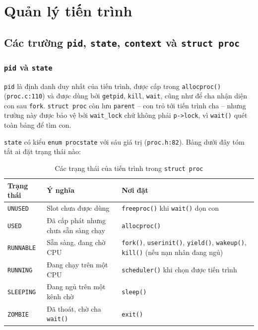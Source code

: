 \chapter{Quản lý tiến trình}

\newpage

\section{Các trường \texttt{pid}, \texttt{state}, \texttt{context} và \texttt{struct proc}}

\subsection{\texttt{pid} và \texttt{state}}

\texttt{pid} là định danh duy nhất của tiến trình, được cấp trong \texttt{allocproc()} (\texttt{proc.c:110}) và được dùng bởi \texttt{getpid}, \texttt{kill}, \texttt{wait}, cũng như để cha nhận diện con sau \texttt{fork}. \texttt{struct proc} còn lưu \texttt{parent} – con trỏ tới tiến trình cha – nhưng trường này được bảo vệ bởi \texttt{wait\_lock} chứ không phải \texttt{p->lock}, vì \texttt{wait()} quét toàn bảng để tìm con.

\texttt{state} có kiểu \texttt{enum procstate} với sáu giá trị (\texttt{proc.h:82}). Bảng dưới đây tóm tắt ai đặt trạng thái nào:

\begin{table}[H]
    \centering
    \renewcommand{\arraystretch}{1.3}
    \setlength{\tabcolsep}{8pt}
    \begin{tabular}{|l|p{4.5cm}|p{7.5cm}|}
        \hline
        \rowcolor[rgb]{0.8, 0.9, 1.0}
        \textbf{Trạng thái} & \textbf{Ý nghĩa} & \textbf{Nơi đặt} \\ \hline
        \texttt{UNUSED} & Slot chưa được dùng & \texttt{freeproc()} khi \texttt{wait()} dọn con \\ \hline
        \texttt{USED} & Đã cấp phát nhưng chưa sẵn sàng chạy & \texttt{allocproc()} \\ \hline
        \texttt{RUNNABLE} & Sẵn sàng, đang chờ CPU & \texttt{fork()}, \texttt{userinit()}, \texttt{yield()}, \texttt{wakeup()}, \texttt{kill()} (nếu nạn nhân đang ngủ) \\ \hline
        \texttt{RUNNING} & Đang chạy trên một CPU & \texttt{scheduler()} khi chọn được tiến trình \\ \hline
        \texttt{SLEEPING} & Đang ngủ trên một kênh chờ & \texttt{sleep()} \\ \hline
        \texttt{ZOMBIE} & Đã thoát, chờ cha \texttt{wait()} & \texttt{exit()} \\ \hline
    \end{tabular}
    \caption{Các trạng thái của tiến trình trong \texttt{struct proc}}
\end{table}

